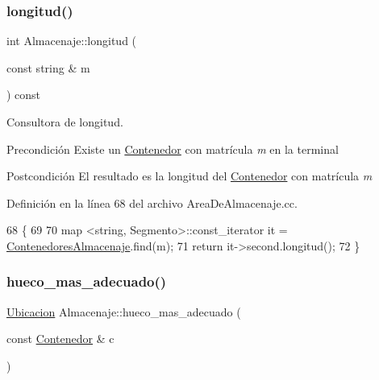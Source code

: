 \subsubsection{\texorpdfstring{longitud()}{longitud()}}
{\footnotesize\ttfamily int Almacenaje\+::longitud (\begin{DoxyParamCaption}\item[{const string \&}]{m }\end{DoxyParamCaption}) const}



Consultora de longitud. 

\begin{DoxyPrecond}{Precondición}
Existe un \hyperlink{class_contenedor}{Contenedor} con matrícula {\itshape m} en la terminal 
\end{DoxyPrecond}
\begin{DoxyPostcond}{Postcondición}
El resultado es la longitud del \hyperlink{class_contenedor}{Contenedor} con matrícula {\itshape m} 
\end{DoxyPostcond}


Definición en la línea 68 del archivo Area\+De\+Almacenaje.\+cc.


\begin{DoxyCode}
68                                                \{
69     
70     map <string, Segmento>::const\_iterator it = \hyperlink{class_almacenaje_ab3cfe0feaf244094a7e2c5225ee681e6}{ContenedoresAlmacenaje}.find(m);
71     \textcolor{keywordflow}{return} it->second.longitud();
72 \}
\end{DoxyCode}
\mbox{\label{class_almacenaje_a8a62209a8e83a59eb900913c3dc5f377}} 
\subsubsection{\texorpdfstring{hueco\+\_\+mas\+\_\+adecuado()}{hueco\_mas\_adecuado()}}
{\footnotesize\ttfamily \hyperlink{class_ubicacion}{Ubicacion} Almacenaje\+::hueco\+\_\+mas\+\_\+adecuado (\begin{DoxyParamCaption}\item[{const \hyperlink{class_contenedor}{Contenedor} \&}]{c }\end{DoxyParamCaption})}



